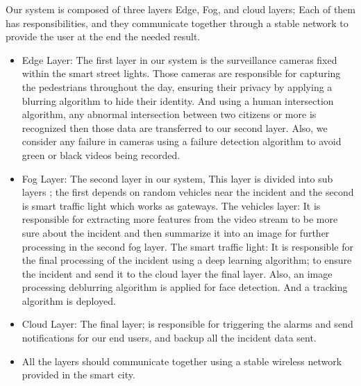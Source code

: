 \documentclass[12pt]{article}
\begin{document}
Our system is composed of three layers Edge, Fog, and cloud layers; Each of them has responsibilities, and they communicate together through a stable network to provide the user at the end the needed result.
\begin{itemize}
\item Edge Layer: The first layer in our system is the surveillance cameras fixed within the smart street lights. Those cameras are responsible for capturing the pedestrians throughout the day, ensuring their privacy by applying a blurring algorithm to hide their identity. And using a human intersection algorithm, any abnormal intersection between two citizens or more is recognized then those data are transferred to our second layer. Also, we consider any failure in cameras using a failure detection algorithm to avoid green or black videos being recorded.
\item Fog Layer: The second layer in our system, This layer is divided into sub layers ; the first depends on random vehicles near the incident and the second is smart traffic light which works as gateways.
\subitem The vehicles layer: It is responsible for extracting more features from the video stream to be more sure about the incident and then summarize it into an image for further processing in the second fog layer.
\subitem The smart traffic light: It is responsible for the final processing of the incident using a deep learning algorithm; to ensure the incident and send it to the cloud layer the final layer. Also, an image processing deblurring algorithm is applied for face detection. And a tracking algorithm is deployed.
\item Cloud Layer: The final layer; is responsible for triggering the alarms and send notifications for our end users, and backup all the incident data sent.
\item All the layers should communicate together using a stable wireless network provided in the smart city.
\end{itemize} 
\end{document}

